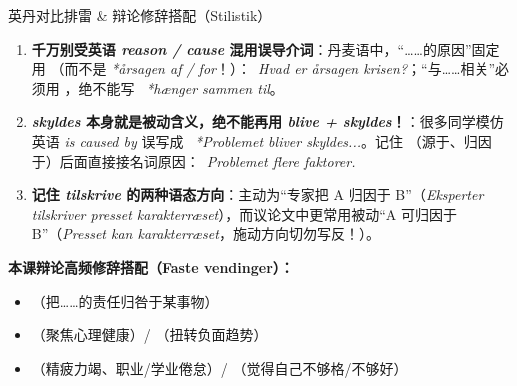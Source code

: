 \begin{grammatikbox}{英丹对比排雷 \& 辩论修辞搭配（Stilistik）}
\begin{enumerate}
  \item \textbf{千万别受英语 \textit{reason / cause} 混用误导介词}：丹麦语中，“……的原因”固定用 （而不是 \textit{*årsagen af / for}！）：\ \textit{Hvad er årsagen  krisen?}；“与……相关”必须用 ，绝不能写 \ \textit{*hænger sammen til}。
  \item \textbf{\textit{skyldes} 本身就是被动含义，绝不能再用 \textit{blive + skyldes}！}：很多同学模仿英语 \textit{is caused by} 误写成 \ \textit{*Problemet bliver skyldes...}。记住 （源于、归因于）后面直接接名词原因：\ \textit{Problemet  flere faktorer.}
  \item \textbf{记住 \textit{tilskrive} 的两种语态方向}：主动为“专家把 A 归因于 B”（\textit{Eksperter tilskriver presset karakterræset}），而议论文中更常用被动“A 可归因于 B”（\textit{Presset kan  karakterræset}，施动方向切勿写反！）。
\end{enumerate}

\textbf{本课辩论高频修辞搭配（Faste vendinger）：}
\begin{itemize}
  \item {}（把……的责任归咎于某事物）
  \item {}（聚焦心理健康）/ （扭转负面趋势）
  \item {}（精疲力竭、职业/学业倦怠）/ （觉得自己不够格/不够好）
\end{itemize}
\end{grammatikbox}



